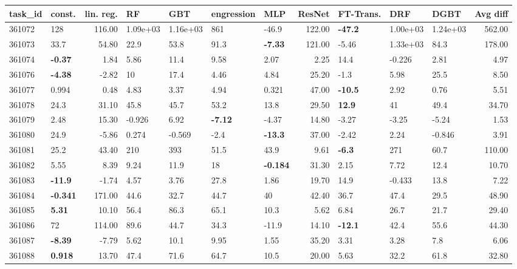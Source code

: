 \begin{table}[ht!]
\centering
\begingroup\footnotesize
\begin{tabular}{llrllllrlllr}
  \hline
\hline
task\_id & const. & lin. reg. & RF & GBT & engression & MLP & ResNet & FT-Trans. & DRF & DGBT & Avg diff \\ 
  \hline
361072 & 128 & 116.00 &  1.09e+03 &  1.16e+03 & 861 & -46.9 & 122.00 & \textbf{-47.2} &  1.00e+03 &  1.24e+03 & 562.00 \\ 
  361073 & 33.7 & 54.80 & 22.9 & 53.8 & 91.3 & \textbf{-7.33} & 121.00 & -5.46 &  1.33e+03 & 84.3 & 178.00 \\ 
  361074 & \textbf{-0.37} & 1.84 & 5.86 & 11.4 & 9.58 & 2.07 & 2.25 & 14.4 & -0.226 & 2.81 & 4.97 \\ 
  361076 & \textbf{-4.38} & -2.82 & 10 & 17.4 & 4.46 & 4.84 & 25.20 & -1.3 & 5.98 & 25.5 & 8.50 \\ 
  361077 & 0.994 & 0.48 & 4.83 & 3.37 & 4.94 & 0.321 & 47.00 & \textbf{-10.5} & 2.92 & 0.76 & 5.51 \\ 
  361078 & 24.3 & 31.10 & 45.8 & 45.7 & 53.2 & 13.8 & 29.50 & \textbf{12.9} & 41 & 49.4 & 34.70 \\ 
  361079 & 2.48 & 15.30 & -0.926 & 6.92 & \textbf{-7.12} & -4.37 & 14.80 & -3.27 & -3.25 & -5.24 & 1.53 \\ 
  361080 & 24.9 & -5.86 & 0.274 & -0.569 & -2.4 & \textbf{-13.3} & 37.00 & -2.42 & 2.24 & -0.846 & 3.91 \\ 
  361081 & 25.2 & 43.40 & 210 & 393 & 51.5 & 43.9 & 9.61 & \textbf{-6.3} & 271 & 60.7 & 110.00 \\ 
  361082 & 5.55 & 8.39 & 9.24 & 11.9 & 18 & \textbf{-0.184} & 31.30 & 2.15 & 7.72 & 12.4 & 10.70 \\ 
  361083 & \textbf{-11.9} & -1.74 & 4.57 & 3.76 & 27.8 & 1.86 & 19.70 & 14.9 & -0.433 & 13.8 & 7.22 \\ 
  361084 & \textbf{-0.341} & 171.00 & 44.6 & 32.7 & 44.7 & 40 & 42.40 & 36.7 & 47.4 & 29.5 & 48.90 \\ 
  361085 & \textbf{5.31} & 10.10 & 56.4 & 86.3 & 65.1 & 10.3 & 5.62 & 6.84 & 26.7 & 21.7 & 29.40 \\ 
  361086 & 72 & 114.00 & 89.6 & 44.7 & 34.3 & -11.9 & 14.10 & \textbf{-12.1} & 42.4 & 55.6 & 44.30 \\ 
  361087 & \textbf{-8.39} & -7.79 & 5.62 & 10.1 & 9.95 & 1.55 & 35.20 & 3.31 & 3.28 & 7.8 & 6.06 \\ 
  361088 & \textbf{0.918} & 13.70 & 47.4 & 71.6 & 64.7 & 10.5 & 20.00 & 5.63 & 32.2 & 61.8 & 32.80 \\ 

\end{tabular}
\end{table}
